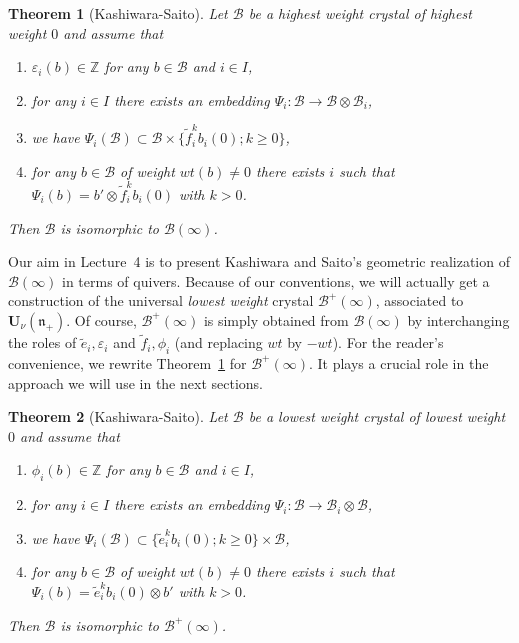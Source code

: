\documentclass[a4paper,10pt]{amsart}
\def\Z{\mathbb{Z}}
\def\U{\mathbf{U}}
\def\n{\mathfrak{n}}
\newtheorem{theo}{\bf{Theorem}}[section]
\numberwithin{equation}{section}
\begin{document}
\begin{theo}[Kashiwara-Saito]\label{T:KSBinfty} Let $\mathcal{B}$ be a highest weight crystal of highest weight $0$ and assume that
\begin{enumerate}
\item[i)] $\varepsilon_i(b) \in \Z$ for any $b \in \mathcal{B}$ and $i \in I$,
\item[ii)] for any $i \in I$ there exists an embedding $\Psi_i :\mathcal{B} \to \mathcal{B} \otimes \mathcal{B}_i$,
\item[iii)] we have $\Psi_i(\mathcal{B}) \subset \mathcal{B} \times \{ \tilde{f}_i^k b_i(0); k \geq 0\}$,
\item[iv)] for any $b \in \mathcal{B}$ of weight $wt(b) \neq 0$ there exists $i$ such that $\Psi_i(b)=b' \otimes \tilde{f}_i^kb_i(0)$ with $k >0$.
\end{enumerate}
Then $\mathcal{B}$ is isomorphic to $\mathcal{B}(\infty)$.
\end{theo}

\vspace{.1in}


Our aim in Lecture~4 is to present Kashiwara and Saito's geometric realization of $\mathcal{B}(\infty)$ in terms of quivers. Because of our conventions, we will actually get a construction of the universal \textit{lowest weight} crystal $\mathcal{B}^+(\infty)$, associated to $\U_{\nu}(\n_+)$. Of course, $\mathcal{B}^+(\infty)$ is simply obtained from $\mathcal{B}(\infty)$ by interchanging the roles of $\tilde{e}_i, \varepsilon_i$ and $\tilde{f}_i, \phi_i$ (and replacing $wt$ by $-wt$). For the reader's convenience, we rewrite Theorem~\ref{T:KSBinfty} for $\mathcal{B}^+(\infty)$. It plays a crucial role in the approach we will use in the next sections.

\vspace{.1in}

\begin{theo}[Kashiwara-Saito]\label{T:KSBinfty2} Let $\mathcal{B}$ be a lowest weight crystal of lowest weight $0$ and assume that
\begin{enumerate}
\item[i)] $\phi_i(b) \in \Z$ for any $b \in \mathcal{B}$ and $i \in I$,
\item[ii)] for any $i \in I$ there exists an embedding $\Psi_i :\mathcal{B} \to \mathcal{B}_i \otimes \mathcal{B}$,
\item[iii)] we have $\Psi_i(\mathcal{B}) \subset \{ \tilde{e}_i^k b_i(0); k \geq 0\} \times \mathcal{B}$,
\item[iv)] for any $b \in \mathcal{B}$ of weight $wt(b) \neq 0$ there exists $i$ such that $\Psi_i(b)= \tilde{e}_i^kb_i(0)\otimes b'$ with $k >0$.
\end{enumerate}
Then $\mathcal{B}$ is isomorphic to $\mathcal{B}^+(\infty)$.
\end{theo}
\end{document}

